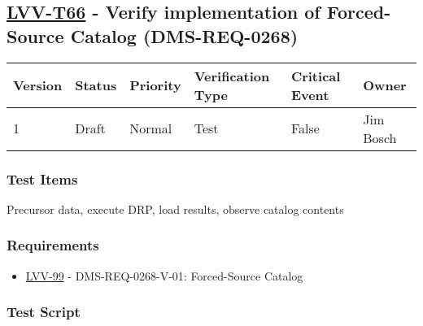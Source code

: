\hypertarget{lvv-t66---verify-implementation-of-forced-source-catalog-dms-req-0268}{%
\subsection{\texorpdfstring{\href{https://jira.lsstcorp.org/secure/Tests.jspa\#/testCase/LVV-T66}{LVV-T66}
- Verify implementation of Forced-Source Catalog
(DMS-REQ-0268)}{LVV-T66 - Verify implementation of Forced-Source Catalog (DMS-REQ-0268)}}\label{lvv-t66---verify-implementation-of-forced-source-catalog-dms-req-0268}}

\begin{longtable}[]{@{}llllll@{}}
\toprule
Version & Status & Priority & Verification Type & Critical Event &
Owner\tabularnewline
\midrule
\endhead
1 & Draft & Normal & Test & False & Jim Bosch\tabularnewline
\bottomrule
\end{longtable}

\hypertarget{test-items-155}{%
\subsubsection{Test Items}\label{test-items-155}}

Precursor data, execute DRP, load results, observe catalog contents

\hypertarget{requirements-156}{%
\subsubsection{Requirements}\label{requirements-156}}

\begin{itemize}
\tightlist
\item
  \href{https://jira.lsstcorp.org/browse/LVV-99}{LVV-99} -
  DMS-REQ-0268-V-01: Forced-Source Catalog
\end{itemize}

\hypertarget{test-script-156}{%
\subsubsection{Test Script}\label{test-script-156}}

